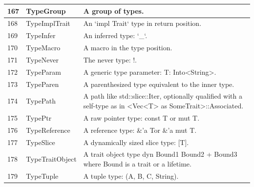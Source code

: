 \begin{longtable}{| p{} | p{} | p{} |}
167   & TypeGroup                      & A group of types.                                                                                              \\ \hline
168   & TypeImplTrait                  & An `impl Trait` type in return position.                                                                       \\ \hline
169   & TypeInfer                      & An inferred type: `\_`.                                                                                         \\ \hline
170   & TypeMacro                      & A macro in the type position.                                                                                  \\ \hline
171   & TypeNever                      & The never type: !.                                                                                             \\ \hline
172   & TypeParam                      & A generic type parameter: T: Into<String>.                                                                     \\ \hline
173   & TypeParen                      & A parenthesized type equivalent to the inner type.                                                             \\ \hline
174   & TypePath                       & A path like std::slice::Iter, optionally qualified with a self-type as in <Vec<T> as SomeTrait>::Associated.   \\ \hline
175   & TypePtr                        & A raw pointer type: const T or \*mut T.                                                                        \\ \hline
176   & TypeReference                  & A reference type: \&'a Tor \&'a mut T.                                                                           \\ \hline
177   & TypeSlice                      & A dynamically sized slice type: [T].                                                                           \\ \hline
178   & TypeTraitObject                & A trait object type dyn Bound1 Bound2 + Bound3 where Bound is a trait or a lifetime.                           \\ \hline
179   & TypeTuple                      & A tuple type: (A, B, C, String).                                                                               \\ \hline

\end{longtable}
